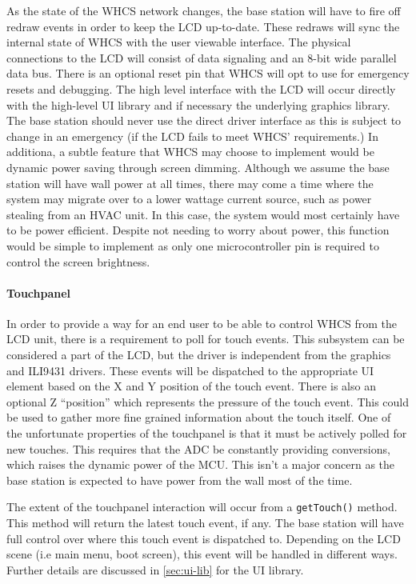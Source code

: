 As the state of the WHCS network changes, the base station will have to fire
off redraw events in order to keep the LCD up-to-date. These redraws will sync
the internal state of WHCS with the user viewable interface. The physical
connections to the LCD will consist of data signaling and an 8-bit wide
parallel data bus. There is an optional reset pin that WHCS will opt to use for
emergency resets and debugging. The high level interface with the LCD will
occur directly with the high-level UI library and if necessary the underlying
graphics library. The base station should never use the direct driver interface
as this is subject to change in an emergency (if the LCD fails to meet WHCS'
requirements.) In additiona, a subtle feature that WHCS may choose to implement would be
dynamic power saving through screen dimming. Although we assume the base
station will have wall power at all times, there may come a time where the
system may migrate over to a lower wattage current source, such as power
stealing from an HVAC unit. In this case, the system would most certainly have
to be power efficient. Despite not needing to worry about power, this function
would be simple to implement as only one microcontroller pin is required to
control the screen brightness.

\paragraph{Touchpanel}
In order to provide a way for an end user to be able to control WHCS from the
LCD unit, there is a requirement to poll for touch events.
This subsystem can be considered a part of the LCD, but the driver is independent
from the graphics and ILI9431 drivers. These events will be dispatched
to the appropriate UI element  based on the X and Y position of the touch
event. There is also an optional Z ``position'' which represents the pressure
of the touch event. This could be used to gather more fine grained information
about the touch itself. One of the unfortunate properties of the touchpanel is
that it must be actively polled for new touches. This requires that the ADC be
constantly providing conversions, which raises the dynamic power of the MCU.
This isn't a major concern as the base station is expected to have power from the wall
most of the time.

The extent of the touchpanel interaction will occur from a \texttt{getTouch()}
method. This method will return the latest touch event, if any. The base
station will have full control over where this touch event is dispatched to.
Depending on the LCD scene (i.e main menu, boot screen), this event will be
handled in different ways. Further details are discussed in
\autoref{sec:ui-lib} for the UI library.

